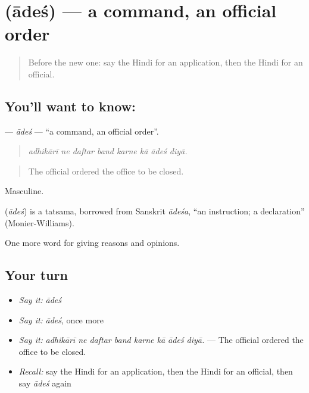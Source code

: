 \section[\texorpdfstring{\hi{आदेश} (ādeś)}{आदेश (ādeś)}]{ (ādeś) — a command, an official order}

\label{lesson:HI-C355-ades}



\begin{quote}
Before the new one: say the Hindi for an application, then the Hindi for an official.
\end{quote}

\subsection*{You'll want to know: }
\textbf{} — \emph{ādeś} — \textquotedblleft{}a command, an official order\textquotedblright{}.

\begin{quote}
       
\end{quote}

\begin{quote}
\emph{adhikārī ne daftar band karne kā ādeś diyā.}
\end{quote}

\begin{quote}
The official ordered the office to be closed.
\end{quote}

Masculine.

\begin{cousinweb}
\textbf{} (\emph{ādeś}) is a tatsama, borrowed from Sanskrit \emph{ādeśa}, \textquotedblleft{}an instruction; a declaration\textquotedblright{} (Monier-Williams).
\end{cousinweb}

\begin{grammarlens}[title={What you've built}]
One more word for giving reasons and opinions.
\end{grammarlens}

\subsection*{Your turn}
\begin{itemize}
\raggedright
  \item \emph{Say it:} \emph{ādeś}
  \item \emph{Say it:} \emph{ādeś}, once more
  \item \emph{Say it:} \emph{adhikārī ne daftar band karne kā ādeś diyā.} — The official ordered the office to be closed.
  \item \emph{Recall:} say the Hindi for an application, then the Hindi for an official, then say \emph{ādeś} again
\end{itemize}

